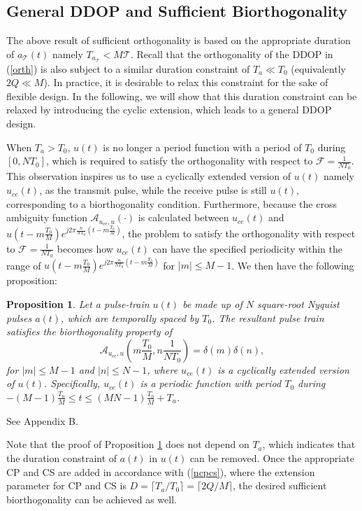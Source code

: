 \documentclass[journal]{IEEEtran}
\newtheorem{prop}{Proposition}
\begin{document}
\subsection{General DDOP and Sufficient Biorthogonality}
The above result of sufficient orthogonality is based on the appropriate duration of $a_{\mathcal T} (t)$ namely $T_{a_{\mathcal T}} < M\mathcal T$.
Recall that the orthogonality of the DDOP in (\ref{orth}) is also subject to a similar duration constraint of $T_a\ll T_0$ (equivalently $2Q\ll M$).
In practice, it is desirable to relax this constraint for the sake of flexible design. In the following, we will show that this duration constraint can be relaxed by introducing the cyclic extension, which leads to a general DDOP design.

When $T_a>T_0$, $u(t)$ is no longer a period function with a period of $T_0$ during $[0,NT_0]$, which is required to satisfy the orthogonality with respect to  $\mathcal F=\frac{1}{NT_0}$.
This observation inspires us to use a cyclically extended version of $u(t)$ namely $u_{ce}(t)$, as the transmit pulse, while the receive pulse is still $u(t)$, {corresponding to a biorthogonality condition}. Furthermore, because the cross ambiguity function $\mathcal A_{u_{ce},u}(\cdot)$
is calculated between $u_{ce}(t)$ and $u(t- m\frac{T_0}{M})e^{j2\pi \frac{n}{NT_0}(t- m\frac{T_0}{M})}$, the problem to satisfy the orthogonality with respect to  $\mathcal F=\frac{1}{NT_0}$ becomes how $u_{ce}(t)$ can have the specified periodicity within the range of $u(t-m\frac{T_0}{M})e^{j2\pi \frac{n}{NT_0}(t-m\frac{T_0}{M})}$ for $|m|\le M-1$.
We then have the following proposition:
\begin{prop}\label{l2}
  Let a pulse-train $u(t)$ be made up of $N$ square-root Nyquist pulses $a(t)$, which are temporally spaced by $T_0$. The resultant pulse train satisfies the biorthogonality property of
  \begin{equation}\label{afgceg}
    \mathcal A_{u_{ce},u}\left(m\frac{T_0}{M},n \frac{1}{NT_0}\right)= \delta(m)\delta(n),
  \end{equation}
  for $|m|\le M-1$ and $|n|\le N-1$, where
  $u_{ce}(t)$ is a {cyclically extended version of $u(t)$. Specifically, $u_{ce}(t)$ is a} periodic function with period $T_0$ during $-(M-1)\frac{T_0}{M}\le t \le (MN-1)\frac{T_0}{M}+T_a$. 
\end{prop}
\begin{IEEEproof}
  See Appendix B.
\end{IEEEproof}
Note that the proof of Proposition \ref{l2} does not depend on $T_a$,
which indicates that the duration constraint of $a(t)$ in $u(t)$ can be removed. Once the appropriate CP and CS are added in accordance with (\ref{ncpcs}), where the extension parameter for CP and CS is $D=\lceil T_{a}/T_0 \rceil=\lceil 2Q/M \rceil$, the desired sufficient biorthogonality can be achieved as well.
\end{document}
